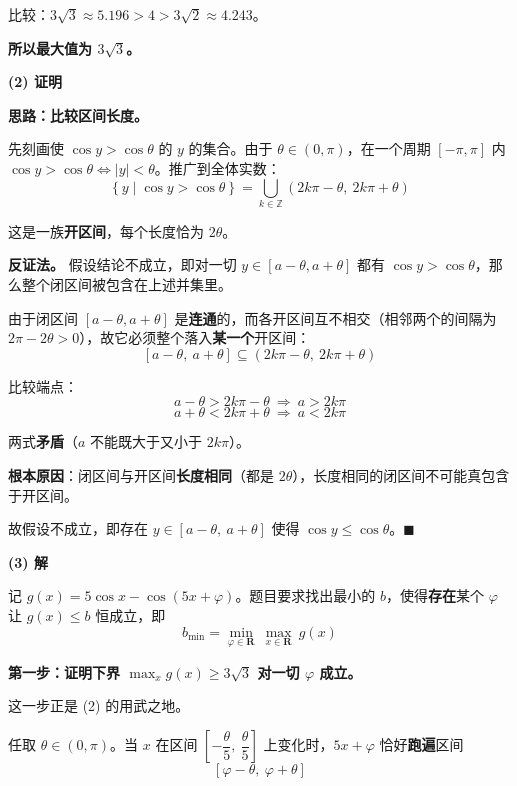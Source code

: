 \begin{answer}
比较：$3\sqrt3\approx5.196>4>3\sqrt2\approx4.243$。

\textbf{所以最大值为 $3\sqrt3$。}

\par\medskip

\textbf{(2) 证明}

\textbf{思路：比较区间长度。}

先刻画使 $\cos y>\cos\theta$ 的 $y$ 的集合。由于 $\theta\in(0,\pi)$，在一个周期 $[-\pi,\pi]$ 内 $\cos y>\cos\theta\iff|y|<\theta$。推广到全体实数：
\nopagebreak[4]
\[\left\{y\mid\cos y>\cos\theta\right\}=\bigcup_{k\in\mathbb Z}\left(2k\pi-\theta,\ 2k\pi+\theta\right)\]

这是一族\textbf{开区间}，每个长度恰为 $2\theta$。

\textbf{反证法。} 假设结论不成立，即对一切 $y\in[a-\theta,a+\theta]$ 都有 $\cos y>\cos\theta$，那么整个闭区间被包含在上述并集里。

由于闭区间 $[a-\theta,a+\theta]$ 是\textbf{连通}的，而各开区间互不相交（相邻两个的间隔为 $2\pi-2\theta>0$），故它必须整个落入\textbf{某一个}开区间：
\nopagebreak[4]
\[[a-\theta,\ a+\theta]\subseteq\left(2k\pi-\theta,\ 2k\pi+\theta\right)\]

比较端点：
\nopagebreak[4]
\[a-\theta>2k\pi-\theta\ \Longrightarrow\ a>2k\pi\]
\nopagebreak[4]
\[a+\theta<2k\pi+\theta\ \Longrightarrow\ a<2k\pi\]

两式\textbf{矛盾}（$a$ 不能既大于又小于 $2k\pi$）。

\textbf{根本原因}：闭区间与开区间\textbf{长度相同}（都是 $2\theta$），长度相同的闭区间不可能真包含于开区间。

故假设不成立，即存在 $y\in[a-\theta,\ a+\theta]$ 使得 $\cos y\le\cos\theta$。$\blacksquare$

\par\medskip

\textbf{(3) 解}

记 $g(x)=5\cos x-\cos(5x+\varphi)$。题目要求找出最小的 $b$，使得\textbf{存在}某个 $\varphi$ 让 $g(x)\le b$ 恒成立，即
\nopagebreak[4]
\[b_{\min}=\min_{\varphi\in\mathbf R}\ \max_{x\in\mathbf R}\ g(x)\]

\textbf{第一步：证明下界 $\max_x g(x)\ge3\sqrt3$ 对一切 $\varphi$ 成立。}

这一步正是 (2) 的用武之地。

任取 $\theta\in(0,\pi)$。当 $x$ 在区间 $\left[-\dfrac\theta5,\ \dfrac\theta5\right]$ 上变化时，$5x+\varphi$ 恰好\textbf{跑遍}区间
\nopagebreak[4]
\[\left[\varphi-\theta,\ \varphi+\theta\right]\]


\end{answer}

